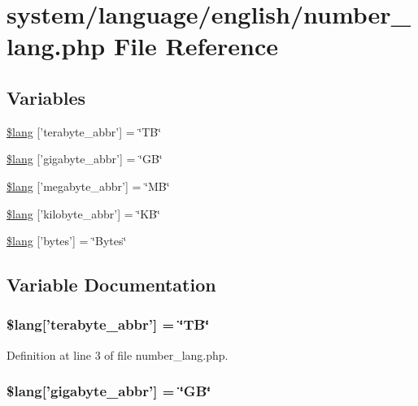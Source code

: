 \hypertarget{number__lang_8php}{\section{system/language/english/number\-\_\-lang.php File Reference}
\label{number__lang_8php}
}
\subsection*{Variables}
\begin{DoxyCompactItemize}
\item 
\hyperlink{number__lang_8php_a72963402ca792afbae1ba34a4050fcde}{\$lang} \mbox{[}'terabyte\-\_\-abbr'\mbox{]} = \char`\"{}T\-B\char`\"{}
\item 
\hyperlink{number__lang_8php_a2349e7364cbc6402c44bd135b132d9d6}{\$lang} \mbox{[}'gigabyte\-\_\-abbr'\mbox{]} = \char`\"{}G\-B\char`\"{}
\item 
\hyperlink{number__lang_8php_ae1fdf8fb2977ddec5fd9f2237f277edc}{\$lang} \mbox{[}'megabyte\-\_\-abbr'\mbox{]} = \char`\"{}M\-B\char`\"{}
\item 
\hyperlink{number__lang_8php_a78200289bbf44dce8b0d5f06072379e6}{\$lang} \mbox{[}'kilobyte\-\_\-abbr'\mbox{]} = \char`\"{}K\-B\char`\"{}
\item 
\hyperlink{number__lang_8php_aeec8ade1229052ff8627a350480bba9c}{\$lang} \mbox{[}'bytes'\mbox{]} = \char`\"{}Bytes\char`\"{}
\end{DoxyCompactItemize}


\subsection{Variable Documentation}
\hypertarget{number__lang_8php_a72963402ca792afbae1ba34a4050fcde}{
\subsubsection[{\$lang}]{\setlength{\rightskip}{0pt plus 5cm}\$lang\mbox{[}'terabyte\-\_\-abbr'\mbox{]} = \char`\"{}T\-B\char`\"{}}}\label{number__lang_8php_a72963402ca792afbae1ba34a4050fcde}


Definition at line 3 of file number\-\_\-lang.\-php.

\hypertarget{number__lang_8php_a2349e7364cbc6402c44bd135b132d9d6}{
\subsubsection[{\$lang}]{\setlength{\rightskip}{0pt plus 5cm}\$lang\mbox{[}'gigabyte\-\_\-abbr'\mbox{]} = \char`\"{}G\-B\char`\"{}}}\label{number__lang_8php_a2349e7364cbc6402c44bd135b132d9d6}


